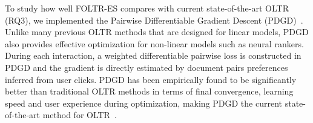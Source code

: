 To study how well FOLTR-ES compares with current state-of-the-art OLTR (RQ3), we implemented the Pairwise Differentiable Gradient Descent (PDGD)~\cite{oosterhuis2018differentiable}. Unlike many previous OLTR methods that are designed for linear models, PDGD also provides effective optimization for non-linear models such as neural rankers. During each interaction, a weighted differentiable pairwise loss is constructed in PDGD and the gradient is directly estimated by document pairs preferences inferred from user clicks. PDGD has been empirically found to be significantly better than traditional OLTR methods in terms of final convergence, learning speed and user experience during optimization, making PDGD the current state-of-the-art method for OLTR~\cite{oosterhuis2018differentiable,jagerman2019model,zhuang2020counterfactual}.

